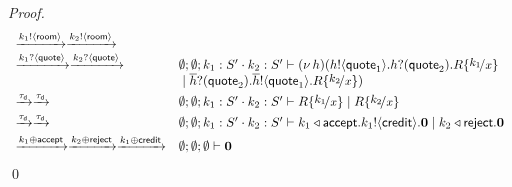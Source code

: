 \begin{proof}
\[\begin{array}{ll}
		\by{\bactout{k_1}{\rtype}} \by{\bactout{k_2}{\rtype}}\\
		\by{\bactinp{k_1}{\Quote}} \by{\bactinp{k_2}{\Quote}}
		& \es; \es; k_1: S' \cat k_2: S' \proves \newsp{h}{
		\bout{h}{\Quote_1} \binp{h}{\Quote_2} R \subst{k_1}{x} \\
		& \Par \binp{\dual{h}}{\Quote_2} \bout{\dual{h}}{\Quote_1} R \subst{k_2}{x}}
\\[1mm]
		\by{\dtau} \by{\dtau}&
		\es; \es; k_1: S' \cat k_2: S' \proves R \subst{k_1}{x} \Par R \subst{k_2}{x}
\\[1mm]
		\by{\dtau} \by{\dtau}&
		\es; \es; k_1: S' \cat k_2: S' \proves
		\bsel{k_1}{\accept} \bout{k_1}{\creditc} \inact 
		\Par \bsel{k_2}{\reject} \inact
\\[1mm]
		\by{\bactsel{k_1}{\accept}} \by{\bactsel{k_2}{\reject}} \by{\bactsel{k_1}{\creditc}}&
		\es; \es; \es \proves \inact
	\end{array}
\]
\qed
\end{proof}







